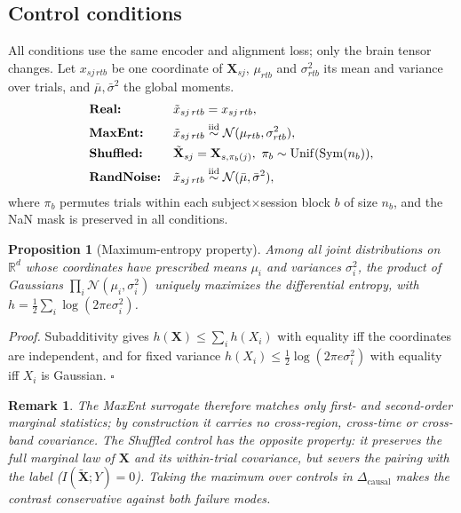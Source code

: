 \documentclass[conference]{IEEEtran}
\newtheorem{proposition}{Proposition}
\newtheorem{remark}{Remark}
\newcommand{\dcausal}{\Delta_{\mathrm{causal}}}
\begin{document}
\subsection{Control conditions}
All conditions use the same encoder and alignment loss; only the brain tensor changes. Let $x_{sj\,rtb}$ be one coordinate of $\mathbf X_{sj}$, $\mu_{rtb}$ and $\sigma^2_{rtb}$ its mean and variance over trials, and $\bar\mu,\bar\sigma^2$ the global moments.
\begin{align}
  &\textbf{Real:} && \tilde x_{sj\,rtb}=x_{sj\,rtb},\notag\\
  &\textbf{MaxEnt:} && \tilde x_{sj\,rtb}\overset{\text{iid}}{\sim}\mathcal N(\mu_{rtb},\sigma^2_{rtb}),\notag\\
  &\textbf{Shuffled:} && \tilde{\mathbf X}_{sj}=\mathbf X_{s,\pi_b(j)},\ \pi_b\sim\mathrm{Unif}(\mathrm{Sym}(n_b)),\notag\\
  &\textbf{RandNoise:} && \tilde x_{sj\,rtb}\overset{\text{iid}}{\sim}\mathcal N(\bar\mu,\bar\sigma^2),\notag
\end{align}
where $\pi_b$ permutes trials within each subject$\times$session block $b$ of size $n_b$, and the NaN mask is preserved in all conditions.

\begin{proposition}[Maximum-entropy property]\label{prop:maxent}
Among all joint distributions on $\mathbb R^{d}$ whose coordinates have prescribed means $\mu_i$ and variances $\sigma_i^2$, the product of Gaussians $\prod_i\mathcal N(\mu_i,\sigma_i^2)$ uniquely maximizes the differential entropy, with $h=\tfrac12\sum_i\log(2\pi e\sigma_i^2)$.
\end{proposition}
\emph{Proof.} Subadditivity gives $h(\mathbf X)\le\sum_i h(X_i)$ with equality iff the coordinates are independent, and for fixed variance $h(X_i)\le\tfrac12\log(2\pi e\sigma_i^2)$ with equality iff $X_i$ is Gaussian. $\square$

\begin{remark}
The MaxEnt surrogate therefore matches only first- and second-order \emph{marginal} statistics; by construction it carries no cross-region, cross-time or cross-band covariance. The Shuffled control has the opposite property: it preserves the full marginal law of $\mathbf X$ and its within-trial covariance, but severs the pairing with the label ($I(\tilde{\mathbf X};Y)=0$). Taking the maximum over controls in $\dcausal$ makes the contrast conservative against both failure modes.
\end{remark}
\end{document}
